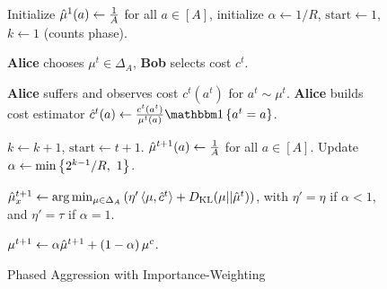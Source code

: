 \documentclass[11pt]{article}
\begin{document}
\begin{figure*}[t]
\centering
\begin{minipage}{1.0\textwidth}
\begin{algorithm}[H]
    \caption{Phased Aggression with Importance-Weighting} \label{algo:phased-aggression-nfg}
    \begin{algorithmic}[1]
        \vspace{1em}
        \State Initialize $\hat{\mu}^{1}(a) \gets \frac{1}{A}$ for all $a\in [A]$, initialize $\alpha \gets 1/R$, $\text{start}\gets 1$, $k \gets 1$ (counts phase).
            
            \State \textbf{Alice} chooses $\mu^t \in \Delta_{A}$, \textbf{Bob} selects cost $c^t$. 
            
            \State \textbf{Alice} suffers and observes cost $c^t(a^t)$ for $a^t\sim \mu^t$.\label{line:sample-nfg}
            \State \textbf{Alice} builds cost estimator $\cHat^t(a) \gets \frac{c^t(a^t)}{\mu^t(a)}\indicator{a^t=a}$. \label{line:loss-nfg}
            
             \label{line:new-phase-nfg}
                \State $k \gets k + 1$, $\text{start} \gets t+1$. \label{line:new-k}
                \State $\hat{\mu}^{t+1}(a) \gets \frac{1}{A}$ for all $a\in [A]$.
                \label{line:reset-omd-nfg}
                \State Update $\alpha \gets \min\left\{ 2^{k-1}/R,~ 1 \right\}$.  \label{line:new-phase2-nfg}
        
        \Else {}
            \State $\hat{\mu}_x^{t+1} \gets \arg\min_{\mu \in \Delta_A} \left( \eta' \left\langle \mu, \hat{c}^t \right\rangle + D_{\text{KL}}(\mu || \hat{\mu}^t) \right)$, with $\eta' = \eta$ if $\alpha < 1$, and $\eta'=\tau$ if $\alpha = 1$. \label{line:omds-nfg}
            
        \EndIf   
            \State $\mu^{t+1} \gets \alpha \hat{\mu}^{t+1} + \left( 1 - \alpha \right) \mu^c$.  \label{line:combine-bandit-nfg}
        \EndFor
    \end{algorithmic}
\end{algorithm}
\end{minipage}
\end{figure*}
\end{document}
